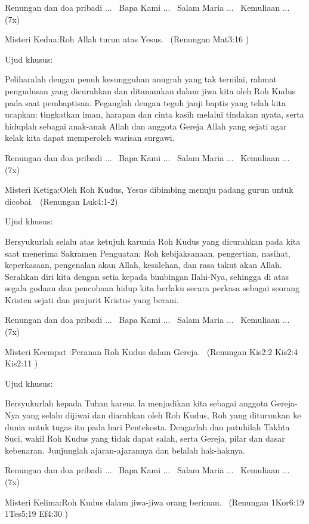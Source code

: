 \documentclass{article}
\begin{document}
Renungan dan doa pribadi ...~ Bapa Kami ...~ Salam Maria ...~ Kemuliaan
... (7x)

Misteri Kedua:{\textquotedbl}Roh Allah turun atas Yesus.{\textquotedbl}~
(Renungan Mat3:16 )

Ujud khusus:~

Peliharalah dengan penuh kesungguhan anugrah yang tak ternilai, rahmat
pengudusan yang dicurahkan dan ditanamkan dalam jiwa kita oleh Roh
Kudus pada saat pembaptisan. Peganglah dengan teguh janji baptis yang
telah kita ucapkan: tingkatkan iman, harapan dan cinta kasih melalui
tindakan nyata, serta hiduplah sebagai anak-anak Allah dan anggota
Gereja Allah yang sejati agar kelak kita dapat memperoleh warisan
surgawi.

Renungan dan doa pribadi ...~ Bapa Kami ...~ Salam Maria ...~ Kemuliaan
... (7x)

Misteri Ketiga:{\textquotedbl}Oleh Roh Kudus, Yesus dibimbing menuju
padang gurun untuk dicobai.{\textquotedbl}~ (Renungan Luk4:1-2)

Ujud khusus:~

Bersyukurlah selalu atas ketujuh karunia Roh Kudus yang dicurahkan pada
kita saat menerima Sakramen Penguatan: Roh kebijaksanaan, pengertian,
nasihat, keperkasaan, pengenalan akan Allah, kesalehan, dan rasa takut
akan Allah. Serahkan diri kita dengan setia kepada bimbingan Ilahi-Nya,
sehingga di atas segala godaan dan pencobaan hidup kita berlaku secara
perkasa sebagai seorang Kristen sejati dan prajurit Kristus yang
berani.

Renungan dan doa pribadi ...~ Bapa Kami ...~ Salam Maria ...~ Kemuliaan
... (7x)

Misteri Keempat :{\textquotedbl}Peranan Roh Kudus dalam
Gereja.{\textquotedbl}~ (Renungan Kis2:2 Kis2:4 Kis2:11 )

Ujud khusus:~

Bersyukurlah kepada Tuhan karena Ia menjadikan kita sebagai anggota
Gereja-Nya yang selalu dijiwai dan diarahkan oleh Roh Kudus, Roh yang
diturunkan ke dunia untuk tugas itu pada hari Pentekosta. Dengarlah dan
patuhilah Takhta Suci, wakil Roh Kudus yang tidak dapat salah, serta
Gereja, pilar dan dasar kebenaran. Junjunglah ajaran-ajarannya dan
belalah hak-haknya.

Renungan dan doa pribadi ...~ Bapa Kami ...~ Salam Maria ...~ Kemuliaan
... (7x)

Misteri Kelima:{\textquotedbl}Roh Kudus dalam jiwa-jiwa orang
beriman.{\textquotedbl}~ (Renungan 1Kor6:19 1Tes5:19 Ef4:30 )
\end{document}
